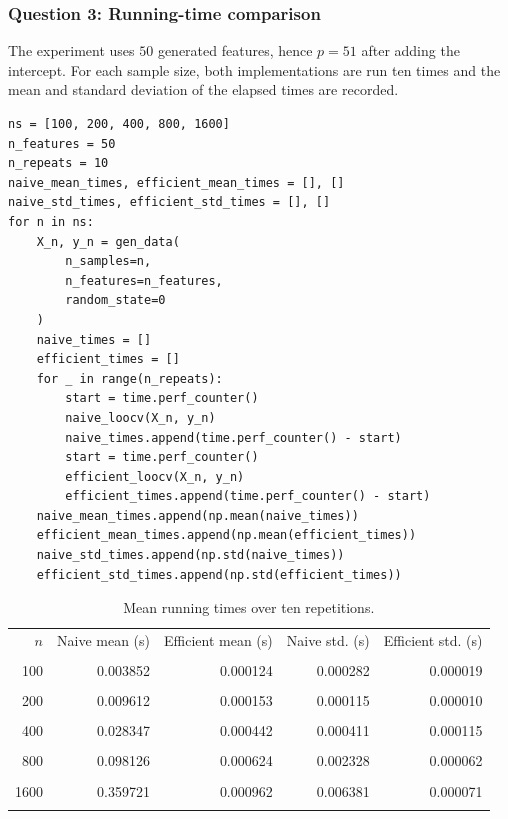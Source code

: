 \documentclass[11pt,a4paper]{article}
\begin{document}
\subsubsection{Question 3: Running-time comparison}
The experiment uses $50$ generated features, hence $p=51$ after adding the
intercept. For each sample size, both implementations are run ten times and the
mean and standard deviation of the elapsed times are recorded.
\begin{lstlisting}[caption={Benchmark over increasing sample sizes.}]
ns = [100, 200, 400, 800, 1600]
n_features = 50
n_repeats = 10
naive_mean_times, efficient_mean_times = [], []
naive_std_times, efficient_std_times = [], []
for n in ns:
    X_n, y_n = gen_data(
        n_samples=n,
        n_features=n_features,
        random_state=0
    )
    naive_times = []
    efficient_times = []
    for _ in range(n_repeats):
        start = time.perf_counter()
        naive_loocv(X_n, y_n)
        naive_times.append(time.perf_counter() - start)
        start = time.perf_counter()
        efficient_loocv(X_n, y_n)
        efficient_times.append(time.perf_counter() - start)
    naive_mean_times.append(np.mean(naive_times))
    efficient_mean_times.append(np.mean(efficient_times))
    naive_std_times.append(np.std(naive_times))
    efficient_std_times.append(np.std(efficient_times))
\end{lstlisting}
\begin{table}[H]
    \centering
    \caption{Mean running times over ten repetitions.}
    \label{tab:timings}
    \small
    \renewcommand{\arraystretch}{1.12}
    \begin{tabular}{rrrrr}
        \toprule
        $n$ & Naive mean (s) & Efficient mean (s) & Naive std. (s) & Efficient std. (s) \\\\
        \midrule
        100  & 0.003852 & 0.000124 & 0.000282 & 0.000019 \\\\
        200  & 0.009612 & 0.000153 & 0.000115 & 0.000010 \\\\
        400  & 0.028347 & 0.000442 & 0.000411 & 0.000115 \\\\
        800  & 0.098126 & 0.000624 & 0.002328 & 0.000062 \\\\
        1600 & 0.359721 & 0.000962 & 0.006381 & 0.000071 \\\\
        \bottomrule
    \end{tabular}
\end{table}
\end{document}
